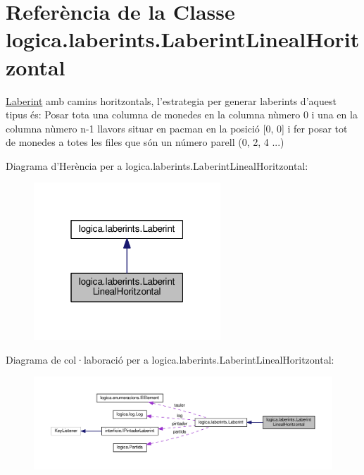 \hypertarget{classlogica_1_1laberints_1_1_laberint_lineal_horitzontal}{\section{Referència de la Classe logica.\+laberints.\+Laberint\+Lineal\+Horitzontal}
\label{classlogica_1_1laberints_1_1_laberint_lineal_horitzontal}
}


\hyperlink{classlogica_1_1laberints_1_1_laberint}{Laberint} amb camins horitzontals, l'estrategia per generar laberints d'aquest tipus és\+: Posar tota una columna de monedes en la columna nùmero 0 i una en la columna nùmero n-\/1 llavors situar en pacman en la posició \mbox{[}0, 0\mbox{]} i fer posar tot de monedes a totes les files que són un número parell (0, 2, 4 ...)  




Diagrama d'Herència per a logica.\+laberints.\+Laberint\+Lineal\+Horitzontal\+:\nopagebreak
\begin{figure}[H]
\begin{center}
\leavevmode
\includegraphics[width=199pt]{classlogica_1_1laberints_1_1_laberint_lineal_horitzontal__inherit__graph}
\end{center}
\end{figure}


Diagrama de col·laboració per a logica.\+laberints.\+Laberint\+Lineal\+Horitzontal\+:\nopagebreak
\begin{figure}[H]
\begin{center}
\leavevmode
\includegraphics[width=350pt]{classlogica_1_1laberints_1_1_laberint_lineal_horitzontal__coll__graph}
\end{center}
\end{figure}

